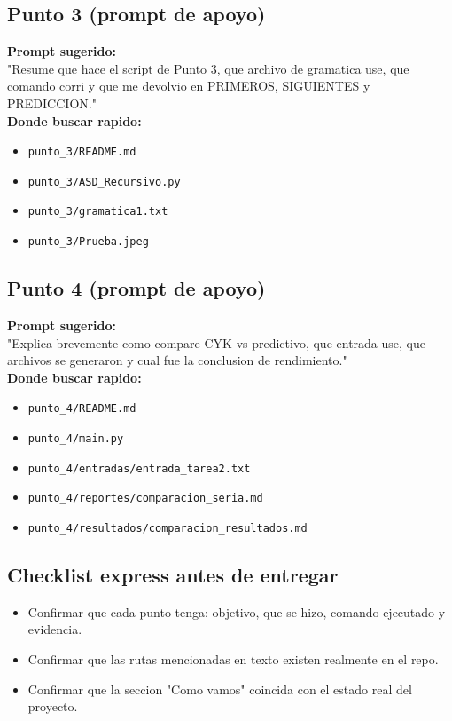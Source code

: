 \documentclass[12pt,a4paper]{article}
\begin{document}
\subsection*{Punto 3 (prompt de apoyo)}
\textbf{Prompt sugerido:} \\
"Resume que hace el script de Punto 3, que archivo de gramatica use, que comando corri y que me devolvio en PRIMEROS, SIGUIENTES y PREDICCION."\\
\textbf{Donde buscar rapido:}
\begin{itemize}
    \item \texttt{punto\_3/README.md}
    \item \texttt{punto\_3/ASD\_Recursivo.py}
    \item \texttt{punto\_3/gramatica1.txt}
    \item \texttt{punto\_3/Prueba.jpeg}
\end{itemize}

\subsection*{Punto 4 (prompt de apoyo)}
\textbf{Prompt sugerido:} \\
"Explica brevemente como compare CYK vs predictivo, que entrada use, que archivos se generaron y cual fue la conclusion de rendimiento."\\
\textbf{Donde buscar rapido:}
\begin{itemize}
    \item \texttt{punto\_4/README.md}
    \item \texttt{punto\_4/main.py}
    \item \texttt{punto\_4/entradas/entrada\_tarea2.txt}
    \item \texttt{punto\_4/reportes/comparacion\_seria.md}
    \item \texttt{punto\_4/resultados/comparacion\_resultados.md}
\end{itemize}

\subsection*{Checklist express antes de entregar}
\begin{itemize}
    \item Confirmar que cada punto tenga: objetivo, que se hizo, comando ejecutado y evidencia.
    \item Confirmar que las rutas mencionadas en texto existen realmente en el repo.
    \item Confirmar que la seccion "Como vamos" coincida con el estado real del proyecto.
\end{itemize}
\end{document}
